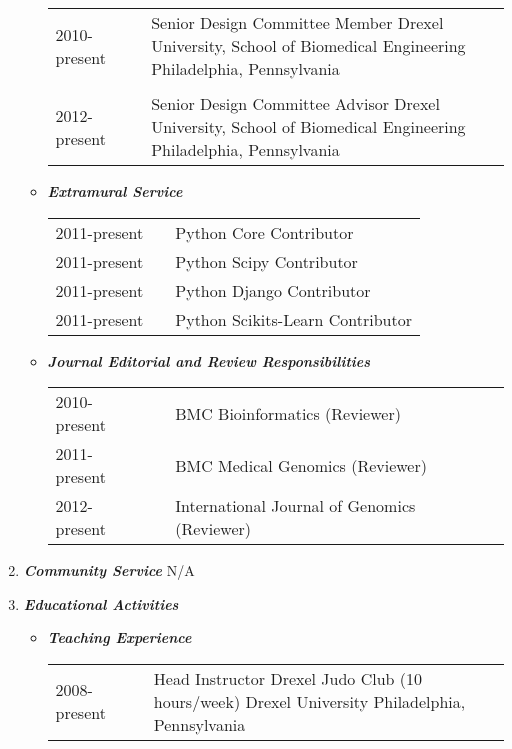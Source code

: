 \documentclass[a4paper,11pt]{article}
\begin{document}
\begin{enumerate}
\begin{itemize}
\begin{longtable}{p{}p{}p{}}
  2010-present & & Senior Design Committee Member \newline Drexel University, School of Biomedical Engineering \newline Philadelphia, Pennsylvania \\
  \\
  2012-present & & Senior Design Committee Advisor \newline Drexel University, School of Biomedical Engineering \newline Philadelphia, Pennsylvania \\
  \end{longtable}
  \item[] {\Large \bfseries \itshape Extramural Service}
  \begin{longtable}{p{}p{}p{}}
  2011-present & & Python Core Contributor \\
  2011-present & & Python Scipy Contributor \\
  2011-present & & Python Django Contributor \\
  2011-present & & Python Scikits-Learn Contributor \\
  \end{longtable}
  \item[] {\Large \bfseries \itshape Journal Editorial and Review Responsibilities}
  \begin{longtable}{p{}p{}p{}}
  2010-present & & BMC Bioinformatics (Reviewer) \\
  2011-present & & BMC Medical Genomics (Reviewer) \\
  2012-present & & International Journal of Genomics (Reviewer) \\
  \end{longtable}
 \end{itemize}
 \item {\LARGE \itshape \bfseries Community Service} \newline
 N/A
 \item {\LARGE \itshape \bfseries Educational Activities}
 \begin{itemize}
  \item[] {\Large \bfseries \itshape Teaching Experience}
   \begin{longtable}{p{}p{}p{}}
  2008-present & & Head Instructor \newline Drexel Judo Club (10 hours/week) \newline Drexel University \newline Philadelphia, Pennsylvania \\

\end{longtable}
\end{itemize}
\end{enumerate}
\end{document}
